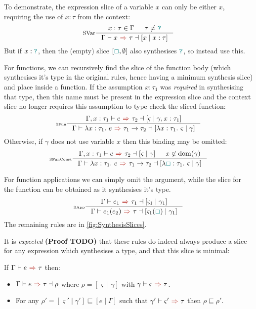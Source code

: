 To demonstrate, the expression slice of a variable $x$ can only be either $x$, requiring the use of $x : \tau$ from the context:
\[
\inference[SVar]{x : \tau \in \Gamma & \tau \neq \dyn}{\synthesisslice{x}{\tau}{[x\mid x:\tau]}}\]
But if $x : {\color{teal}\texttt{?}}$, then the (empty) slice $[{\color{teal}\Box}, \emptyset]$ also synthesises ${\color{teal}\texttt{?}}$, so instead use this. 

For functions, we can recursively find the slice of the function body (which synthesises it's type in the original rules, hence having a minimum synthesis slice) and place inside a function. 
If the assumption $x : \tau_1$ was \textit{required} in synthesising that type, then this name must be present in the expression slice and the context slice no longer requires this assumption to type check the sliced function:
\[\inference[\tiny SFun]{\synthesisslice[\Gamma,x:\tau_1]{e}{\tau_2}{[\varsigma \mid \gamma, x : \tau_1]} }{\synthesisslice{\lambda x:\tau_1.\ e}{\tau_1 \to \tau_2}{[\lambda x : \tau_1.\ \varsigma \mid \gamma]}}\]
Otherwise, if $\gamma$ does not use variable $x$ then this binding may be omitted:
\[\inference[\tiny SFunConst]{\synthesisslice[\Gamma,x:\tau_1]{e}{\tau_2}{[\varsigma \mid \gamma]} & x \not \in \mathrm{dom}(\gamma)}{\synthesisslice{\lambda x:\tau_1.\ e}{\tau_1 \to \tau_2}{[\lambda \gap : \tau_1.\ \varsigma \mid \gamma]}}\]

For function applications we can simply omit the argument, while the slice for the function can be obtained as it synthesises it's type.
\[\inference[\tiny SApp]{\synthesisslice{e_1}{\tau_1}{[\varsigma_1 \mid \gamma_1]}}{\synthesisslice{e_1(e_2)}{\tau}{[\varsigma_1(\gap) \mid \gamma_1]}}\]
The remaining rules are in \cref{fig:SynthesisSlices}.

It is \textit{expected} \textbf{(Proof TODO)} that these rules do indeed always produce a slice for any expression which synthesises a type, and that this slice is minimal:
\begin{conjecture}[Correctness]
\label{conj:SynthesisSliceCorrectness}
If $\synthesis{e}{\tau}$ then:
\begin{itemize}
\item $\synthesisslice{e}{\tau}{\rho}$ where $\rho = [\varsigma \mid \gamma]$ with $\synthesis[\gamma]{\varsigma}{\tau}$.
\item For any $\rho' = [\varsigma' \mid \gamma'] \sqsubseteq [e\mid \Gamma]$ such that $\synthesis[\gamma']{\varsigma'}{\tau}$ then $\rho \sqsubseteq \rho'$.
\end{itemize}
\end{conjecture}

